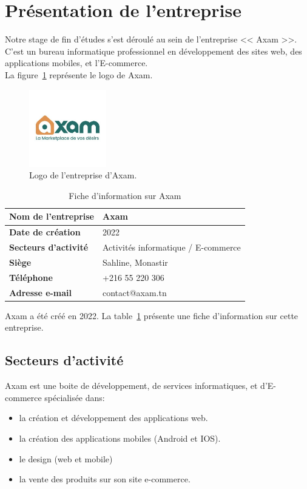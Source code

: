 \section{Présentation de l'entreprise}
\noindent
\large
Notre stage de fin d'études s'est déroulé au sein de l'entreprise << Axam >>. C'est un bureau informatique professionnel en développement des sites web, des applications mobiles, et l'E-commerce. \\
La figure~\ref{fig:axam} représente le logo de Axam.
\begin{figure}[H]
\centering
\includegraphics[width=0.3\textwidth]{logos/axam.png}
\caption{Logo de l'entreprise d'Axam.}
\label{fig:axam}
\end{figure}

\begin{table}[H]
\centering %
\begin{tabular}{|>{\bfseries}m{5cm}|m{8cm}|}
\hline
\rowcolor{blue!20} %
Nom de l’entreprise & Axam \\
\hline
Date de création & 2022 \\
\hline
Secteurs d’activité & Activités informatique / E-commerce\\
\hline
Siège & Sahline, Monastir \\
\hline
Téléphone & +216 55 220 306 \\
\hline
Adresse e-mail & contact@axam.tn \\
\hline
\end{tabular}
\caption{Fiche d’information sur Axam}
\label{tab:axam}
\end{table}
\noindent
Axam a été créé en 2022. La table~\ref{tab:axam} présente une fiche d’information sur cette entreprise.

\subsection{Secteurs d’activité}
\noindent
Axam est une boite de développement, de services informatiques, et d'E-commerce spécialisée dans:
\begin{itemize}
    \item la création et développement des applications web.
    \item la création des applications mobiles (Android et IOS).
    \item le design (web et mobile)
    \item la vente des produits sur son site e-commerce.
\end{itemize}